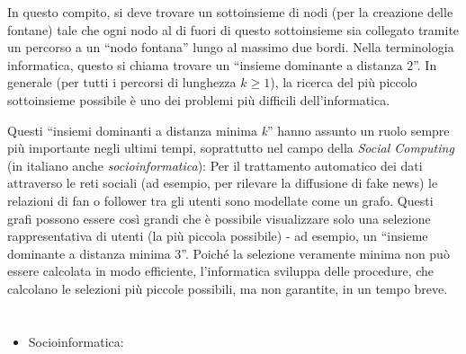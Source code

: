 {{In questo compito, si deve trovare un sottoinsieme di nodi (per la creazione delle fontane) tale che ogni nodo al di fuori di questo sottoinsieme sia collegato tramite un percorso a un \enquote{nodo fontana} lungo al massimo due bordi.  Nella terminologia informatica, questo si chiama trovare un \enquote{insieme dominante a distanza $2$}.  In generale (per tutti i percorsi di lunghezza ${k \geq 1}$), la ricerca del più piccolo sottoinsieme possibile è uno dei problemi più difficili dell’informatica.

Questi \enquote{insiemi dominanti a distanza minima \emph{k}} hanno assunto un ruolo sempre più importante negli ultimi tempi, soprattutto nel campo della \emph{Social Computing} (in italiano anche \emph{socioinformatica}):
Per il trattamento automatico dei dati attraverso le reti sociali (ad esempio, per rilevare la diffusione di fake news)
le relazioni di fan o follower tra gli utenti sono modellate come un grafo.
Questi grafi possono essere così grandi che è possibile visualizzare solo una selezione rappresentativa di utenti (la più piccola possibile) - ad esempio, un \enquote{insieme dominante a distanza minima $3$}.
Poiché la selezione veramente minima non può essere calcolata in modo efficiente, l’informatica sviluppa delle procedure,
che calcolano le selezioni più piccole possibili, ma non garantite, in un tempo breve.



\section*{\BrochureWebsitesAndKeywords}
{\raggedright
\begin{itemize}
  \item Socioinformatica: \href{https://it.wikipedia.org/wiki/Socioinformatica}{}
\end{itemize}


}

}{}

\def\AuthorBarichelloL{} %
\def\AuthorNataliaN{} %
\def\AuthorLunaC{} %
\def\AuthorAlbaradeiS{} %
\def\AuthorPohlW{} %
\def\AuthorDatzkoThutS{} %
\def\AuthorGiangC{} %

\newpage}{}
